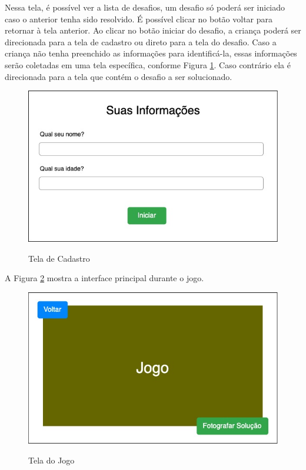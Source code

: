     Nessa tela, é possível ver a lista de desafios, um desafio só poderá ser iniciado caso o anterior tenha sido resolvido.
    É possível clicar no botão voltar para retornar à tela anterior. Ao clicar no botão iniciar do desafio, a criança poderá ser direcionada para a tela de cadastro ou direto para a tela do desafio. Caso a criança não tenha preenchido as informações para identificá-la, essas informações serão coletadas em uma tela específica, conforme Figura \ref{figura:cadastro}. Caso contrário ela é direcionada para a tela que contém o desafio a ser solucionado.
    
    \begin{figure}[H]
        \caption{Tela de Cadastro}
        \centering
        \includegraphics[width=\linewidth]{Imagens/Cap3/informacoes_usuario.jpg}
        \label{figura:cadastro}
    \end{figure}
    
    A Figura \ref{figura:tela_jogo} mostra a interface principal durante o jogo.
    
    \begin{figure}[H]
        \caption{Tela do Jogo}
        \centering
        \includegraphics[width=\linewidth]{Imagens/Cap3/tela_jogo.jpg}
        \label{figura:tela_jogo}
    \end{figure}
    
